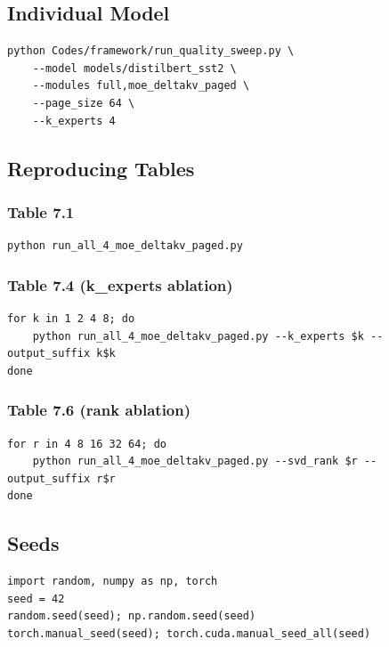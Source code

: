 \subsection{Individual Model}

\begin{lstlisting}
python Codes/framework/run_quality_sweep.py \
    --model models/distilbert_sst2 \
    --modules full,moe_deltakv_paged \
    --page_size 64 \
    --k_experts 4
\end{lstlisting}

\subsection{Reproducing Tables}

\subsubsection{Table 7.1}
\begin{lstlisting}
python run_all_4_moe_deltakv_paged.py
\end{lstlisting}

\subsubsection{Table 7.4 (k\_experts ablation)}
\begin{lstlisting}
for k in 1 2 4 8; do
    python run_all_4_moe_deltakv_paged.py --k_experts $k --output_suffix k$k
done
\end{lstlisting}

\subsubsection{Table 7.6 (rank ablation)}
\begin{lstlisting}
for r in 4 8 16 32 64; do
    python run_all_4_moe_deltakv_paged.py --svd_rank $r --output_suffix r$r
done
\end{lstlisting}

\subsection{Seeds}

\begin{lstlisting}
import random, numpy as np, torch
seed = 42
random.seed(seed); np.random.seed(seed)
torch.manual_seed(seed); torch.cuda.manual_seed_all(seed)
\end{lstlisting}

